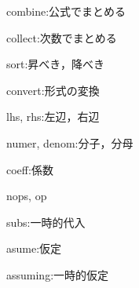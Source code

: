 \documentclass{article}
\begin{document}
\begin{maplelatex}\begin{Maple Normal}{
combine:公式でまとめる}\end{Maple Normal}
\end{maplelatex}
\begin{maplelatex}\begin{Maple Normal}{
collect:次数でまとめる}\end{Maple Normal}
\end{maplelatex}
\begin{maplelatex}\begin{Maple Normal}{
sort:昇べき，降べき}\end{Maple Normal}
\end{maplelatex}
\begin{maplelatex}\begin{Maple Normal}{
convert:形式の変換}\end{Maple Normal}
\end{maplelatex}
\begin{maplelatex}\begin{Maple Normal}{
lhs, rhs:左辺，右辺}\end{Maple Normal}
\end{maplelatex}
\begin{maplelatex}\begin{Maple Normal}{
numer, denom:分子，分母}\end{Maple Normal}
\end{maplelatex}
\begin{maplelatex}\begin{Maple Normal}{
coeff:係数}\end{Maple Normal}
\end{maplelatex}
\begin{maplelatex}\begin{Maple Normal}{
nops, op}\end{Maple Normal}
\end{maplelatex}
\begin{maplelatex}\begin{Maple Normal}{
subs:一時的代入}\end{Maple Normal}
\end{maplelatex}
\begin{maplelatex}\begin{Maple Normal}{
asume:仮定}\end{Maple Normal}
\end{maplelatex}
\begin{maplelatex}\begin{Maple Normal}{
assuming:一時的仮定}\end{Maple Normal}
\end{maplelatex}
\end{document}
